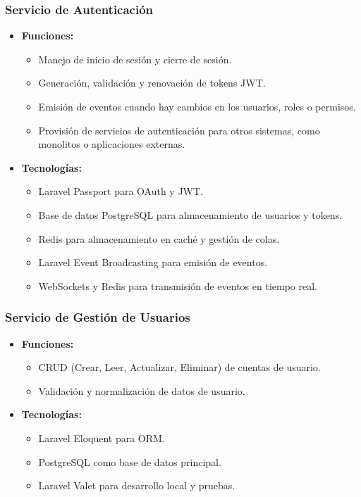 \documentclass{article}
\begin{document}
\subsubsection{Servicio de Autenticación}
\begin{itemize}
    \item \textbf{Funciones:}
          \begin{itemize}
              \item Manejo de inicio de sesión y cierre de sesión.
              \item Generación, validación y renovación de tokens JWT.
              \item Emisión de eventos cuando hay cambios en los usuarios, roles o permisos.
              \item Provisión de servicios de autenticación para otros sistemas, como monolitos o aplicaciones externas.
          \end{itemize}
    \item \textbf{Tecnologías:}
          \begin{itemize}
              \item Laravel Passport para OAuth y JWT.
              \item Base de datos PostgreSQL para almacenamiento de usuarios y tokens.
              \item Redis para almacenamiento en caché y gestión de colas.
              \item Laravel Event Broadcasting para emisión de eventos.
              \item WebSockets y Redis para transmisión de eventos en tiempo real.
          \end{itemize}
\end{itemize}

\subsubsection{Servicio de Gestión de Usuarios}
\begin{itemize}
    \item \textbf{Funciones:}
          \begin{itemize}
              \item CRUD (Crear, Leer, Actualizar, Eliminar) de cuentas de usuario.
              \item Validación y normalización de datos de usuario.
          \end{itemize}
    \item \textbf{Tecnologías:}
          \begin{itemize}
              \item Laravel Eloquent para ORM.
              \item PostgreSQL como base de datos principal.
              \item Laravel Valet para desarrollo local y pruebas.
          \end{itemize}
\end{itemize}
\end{document}
